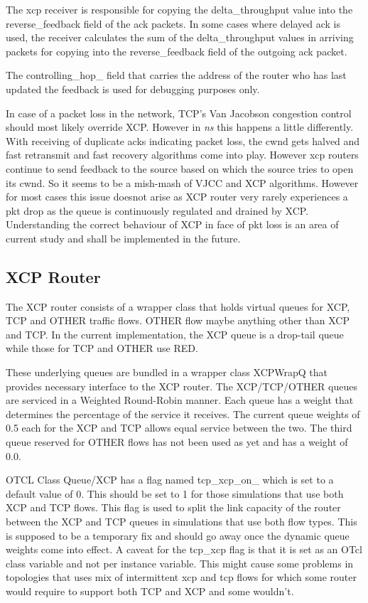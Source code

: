     The xcp receiver is responsible for copying the delta\_throughput
    value into the reverse\_feedback field of the ack packets. In some
    cases where delayed ack is used, the receiver calculates the sum of
    the delta\_throughput values in arriving packets for copying into the
    reverse\_feedback field of the outgoing ack packet.

    The controlling\_hop\_ field that carries the address of the router
    who has last updated the feedback is used for debugging purposes only.

    In case of a packet loss in the network, TCP's Van Jacobson
    congestion control should most likely override XCP.  However in \emph{ns}
    this happens 
    a little differently. With receiving of duplicate acks indicating
    packet loss, the cwnd gets halved and fast retransmit and fast
    recovery algorithms come into play. However xcp routers continue to send
    feedback to the source based on which the source tries to open its
    cwnd. So it seems to be a mish-mash of VJCC and XCP
    algorithms. However for most cases this issue doesnot arise as XCP
    router very rarely experiences a pkt drop as the queue is
    continuously regulated and drained by XCP. Understanding the correct
    behaviour of XCP in face of pkt loss is an area of current study and
    shall be implemented in the future. 

    \subsection{XCP Router}
    \label {sec:xcp_wrapper}
    The XCP router consists of a wrapper class that holds virtual queues
    for XCP, TCP and OTHER traffic flows. OTHER flow maybe anything other
    than XCP and TCP. In the current implementation, the XCP queue is a
    drop-tail queue while those for TCP and OTHER use RED. 

    These underlying queues are bundled in a
    wrapper class XCPWrapQ that provides necessary interface to the XCP
    router. The XCP/TCP/OTHER queues are serviced in a Weighted Round-Robin
    manner. Each queue has a weight that determines the percentage of the
    service it receives. The current queue weights of 0.5 each for the XCP
    and TCP allows equal service between the two. The third queue reserved
    for OTHER flows has not been used as yet and has a weight of 0.0. 
    
    OTCL Class Queue/XCP has a flag named tcp\_xcp\_on\_ which is set to
    a default 
    value of 0. This should be set to 1 for those simulations that use
    both XCP and TCP flows. This flag is used to split the link capacity
    of the router between the XCP and TCP queues in simulations that
    use both flow types. This is supposed to be a temporary fix and
    should go away once the dynamic queue weights come into effect. A
    caveat for the tcp\_xcp flag is that it is set as an OTcl class variable
    and not per instance variable. This might cause some 
    problems in topologies that uses mix of intermittent xcp and tcp
    flows for which some router would require to support both TCP and
    XCP and some wouldn't.
    
